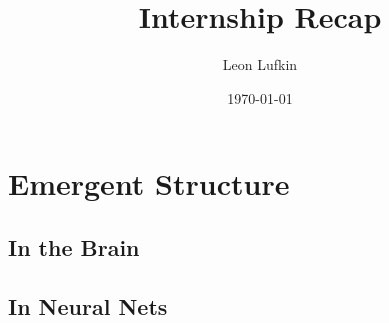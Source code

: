 \documentclass[usletter,twoside,12pt]{book}
\title{Internship Recap}
\author{Leon Lufkin}
\date{\today}
\begin{document}

\chapter{Emergent Structure}

\section{In the Brain}

\section{In Neural Nets}
\end{document}
